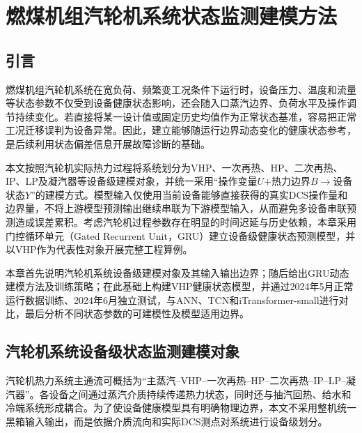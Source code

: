 
\section{燃煤机组汽轮机系统状态监测建模方法}
\label{sec:gru_monitoring_v4}

\subsection{引言}

燃煤机组汽轮机系统在宽负荷、频繁变工况条件下运行时，设备压力、温度和流量等状态参数不仅受到设备健康状态影响，还会随入口蒸汽边界、负荷水平及操作调节持续变化。若直接将某一设计值或固定历史均值作为正常状态基准，容易把正常工况迁移误判为设备异常。因此，建立能够随运行边界动态变化的健康状态参考，是后续利用状态偏差信息开展故障诊断的基础。

本文按照汽轮机实际热力过程将系统划分为VHP、一次再热、HP、二次再热、IP、LP及凝汽器等设备级建模对象，并统一采用“操作变量$U$+热力边界$B\rightarrow$设备状态$Y$”的建模方式。模型输入仅使用当前设备能够直接获得的真实DCS操作量和边界量，不将上游模型预测输出继续串联为下游模型输入，从而避免多设备串联预测造成误差累积。考虑汽轮机过程参数存在明显的时间迟延与历史依赖，本章采用门控循环单元（Gated Recurrent Unit，GRU）建立设备级健康状态预测模型，并以VHP作为代表性对象开展完整工程算例。

本章首先说明汽轮机系统设备级建模对象及其输入输出边界；随后给出GRU动态建模方法及训练策略；在此基础上构建VHP健康状态模型，并通过2024年5月正常运行数据训练、2024年6月独立测试，与ANN、TCN和iTransformer-small进行对比，最后分析不同状态参数的可建模性及模型适用边界。

\subsection{汽轮机系统设备级状态监测建模对象}
\label{subsec:turbine_device_objects_v4}

汽轮机热力系统主通流可概括为“主蒸汽--VHP--一次再热--HP--二次再热--IP--LP--凝汽器”。各设备之间通过蒸汽介质持续传递热力状态，同时还与抽汽回热、给水和冷端系统形成耦合。为了使设备健康模型具有明确物理边界，本文不采用整机统一黑箱输入输出，而是依据介质流向和实际DCS测点对系统进行设备级划分。

